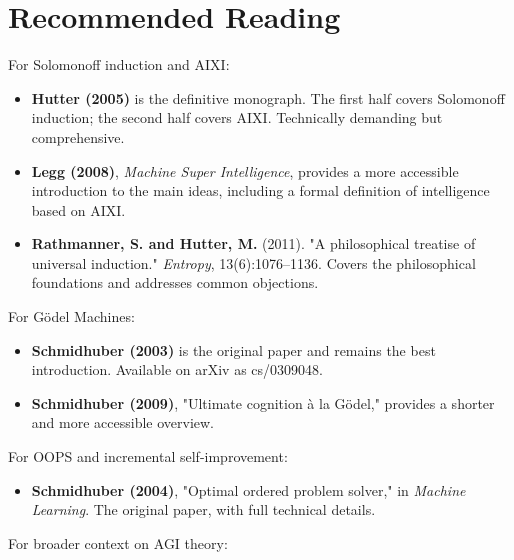 \section{Recommended Reading}

For Solomonoff induction and AIXI:

\begin{itemize}
\item \textbf{Hutter (2005)} is the definitive monograph. The first half covers Solomonoff induction; the second half covers AIXI. Technically demanding but comprehensive.
\end{itemize}

\begin{itemize}
\item \textbf{Legg (2008)}, \textit{Machine Super Intelligence}, provides a more accessible introduction to the main ideas, including a formal definition of intelligence based on AIXI.
\end{itemize}

\begin{itemize}
\item \textbf{Rathmanner, S. and Hutter, M.} (2011). "A philosophical treatise of universal induction." \textit{Entropy}, 13(6):1076--1136. Covers the philosophical foundations and addresses common objections.
\end{itemize}

For Gödel Machines:

\begin{itemize}
\item \textbf{Schmidhuber (2003)} is the original paper and remains the best introduction. Available on arXiv as cs/0309048.
\end{itemize}

\begin{itemize}
\item \textbf{Schmidhuber (2009)}, "Ultimate cognition à la Gödel," provides a shorter and more accessible overview.
\end{itemize}

For OOPS and incremental self-improvement:

\begin{itemize}
\item \textbf{Schmidhuber (2004)}, "Optimal ordered problem solver," in \textit{Machine Learning}. The original paper, with full technical details.
\end{itemize}

For broader context on AGI theory:

